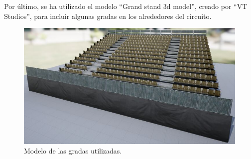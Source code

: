 Por último, se ha utilizado el modelo ``Grand stand 3d model''\cite{grandstand}, creado por ``VT Studios'', para incluir algunas gradas en los alrededores del circuito.

\begin{figure}[H]
    \centering
    \includegraphics[width=\textwidth]{imagenes/converted/grandstand.jpg}
    \caption{Modelo de las gradas utilizadas.}
    \label{fig:grandstand}
\end{figure}